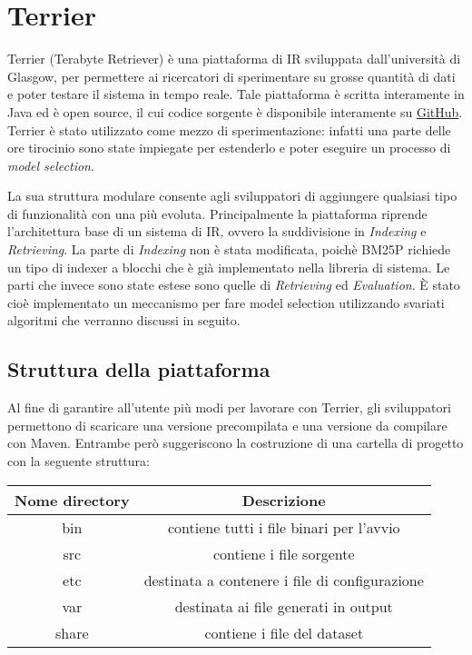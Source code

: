 \chapter{Terrier}
Terrier (Terabyte Retriever) è una piattaforma di IR sviluppata dall'università di Glasgow, per permettere ai ricercatori di sperimentare su
grosse quantità di dati e poter testare il sistema in tempo reale.
Tale piattaforma è scritta interamente in Java ed è open source, il cui codice sorgente è disponibile
interamente su \href{https://github.com/terrier-org/terrier-core}{GitHub}.
\\
Terrier è stato utilizzato come mezzo di sperimentazione: infatti
una parte delle ore tirocinio sono state impiegate per estenderlo e poter eseguire un processo
di \textit{model selection}.

La sua struttura modulare consente agli sviluppatori di aggiungere qualsiasi tipo di funzionalità con una
più evoluta.
Principalmente la piattaforma riprende l'architettura base di un sistema di IR, ovvero la suddivisione in
\textit{Indexing} e \textit{Retrieving}. La parte di \textit{Indexing} non è stata modificata, poichè
BM25P richiede un tipo di indexer a blocchi che è già implementato nella libreria di sistema.
Le parti che invece sono state estese sono quelle di \textit{Retrieving} ed \textit{Evaluation}. 
\`E stato cioè implementato un meccanismo per fare model selection utilizzando svariati algoritmi
che verranno discussi in seguito.

\section{Struttura della piattaforma}
Al fine di garantire all'utente più modi per lavorare con Terrier, gli sviluppatori
permettono di scaricare una versione precompilata e una versione da compilare con
Maven. Entrambe però suggeriscono la costruzione
di una cartella di progetto con la seguente struttura:

\pagebreak

\begin{table}[h]
	\centering
	\begin{tabular}{|c|c|}
		\hline
		\textbf{Nome directory} & \textbf{Descrizione} \\
		\hline
		bin & contiene tutti i file binari per l'avvio \\
		\hline
		src & contiene i file sorgente \\
		\hline
		etc & destinata a contenere i file di configurazione \\
		\hline
		var & destinata ai file generati in output \\
		\hline
		share & contiene i file del dataset \\
		\hline
	\end{tabular}
\end{table}

